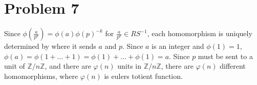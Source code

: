 \documentclass{article}
\begin{document}
\section*{Problem 7}
Since $\phi(\frac{a}{p^k}) = \phi(a)\phi(p)^{-k}$ for $\frac{a}{p^k} \in RS^{-1}$, 
each homomorphism is uniquely determined by where it sends $a$ and $p$.
Since $a$ is an integer and $\phi(1) = 1$, $\phi(a) = \phi(1+\ldots+1) = \phi(1)+\ldots+\phi(1) = a$.
Since $p$ must be sent to a unit of $\mathbb{Z}/n\mathbb{Z}$,
and there are $\varphi(n)$ units in $\mathbb{Z}/n\mathbb{Z}$,
there are $\varphi(n)$ different homomorphisms,
where $\varphi(n)$ is eulers totient function.
\end{document}
